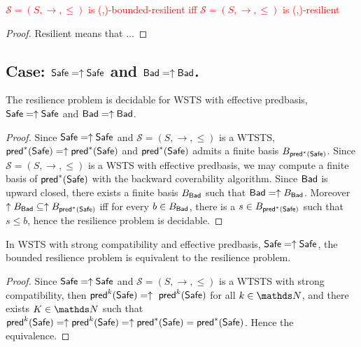 \begin{proposition}\label{general}
\textcolor{red}{
$\mathscr{S}=(S,\rightarrow,\leq)$ is %
(\Bad,\Safe)-bounded-resilient iff $\mathscr{S}=(S,\rightarrow,\leq)$ is %
(\Bad,\Safe)-resilient}
\end{proposition}

\begin{proof}
Resilient means that ...
\end{proof}



\subsection{Case: $\textsf{Safe}=\uparrow \textsf{Safe}$ and $\textsf{Bad}=\uparrow \textsf{Bad}$.}




\begin{theorem}\label{up-up}
The resilience problem is decidable for WSTS with effective predbasis, $\textsf{Safe}=\uparrow \textsf{Safe}$
and $\textsf{Bad}=\uparrow \textsf{Bad}$.

\end{theorem}


\begin{proof}
Since $\textsf{Safe}=\uparrow \textsf{Safe}$ and
$\mathscr{S}=(S,\rightarrow,\leq)$ is a WTSTS,  $\textsf{pred}^*(\textsf{Safe})=\uparrow \textsf{pred}^*(\textsf{Safe})$ and $\textsf{pred}^*(\textsf{Safe})$ admits a finite basis $B_{\textsf{pred}^*(\textsf{Safe})}$. Since $\mathscr{S}=(S,\rightarrow,\leq)$ is a WSTS  with effective predbasis, we may compute a finite basis of $\textsf{pred}^*(\textsf{Safe})$ with the backward coverability algorithm. 
Since $\textsf{Bad}$  is upward closed, there exists a finite basis $B_{\textsf{Bad}}$ such that $\textsf{Bad} = \uparrow B_{\textsf{Bad}}$. Moreover $ \uparrow B_{\textsf{Bad}} \subseteq \uparrow B_{\textsf{pred}^*(\textsf{Safe})}$ iff for every $b \in B_{\textsf{Bad}}$, there is a $s \in B_{\textsf{pred}^*(\textsf{Safe})}$ such that $s \leq b$,
hence the resilience problem is decidable.
\end{proof}

\begin{proposition}
In WSTS with strong compatibility and effective predbasis,  $\textsf{Safe}=\uparrow \textsf{Safe}$, the bounded resilience problem is equivalent to the resilience problem.
\end{proposition}

\begin{proof}
Since $\textsf{Safe}=\uparrow \textsf{Safe}$ and
$\mathscr{S}=(S,\rightarrow,\leq)$ is a WTSTS with strong %
compatibility, then $\textsf{pred}^k(\textsf{Safe})= \uparrow~\textsf{pred}^k(\textsf{Safe})$ for all $k \in \N$,
and there exists $K \in \N$ such that 
$\textsf{pred}^k(\textsf{Safe}) = \uparrow \textsf{pred}^k(\textsf{Safe}) = \uparrow \textsf{pred}^*(\textsf{Safe}) = \textsf{pred}^*(\textsf{Safe})$.
Hence the equivalence.
\end{proof}

